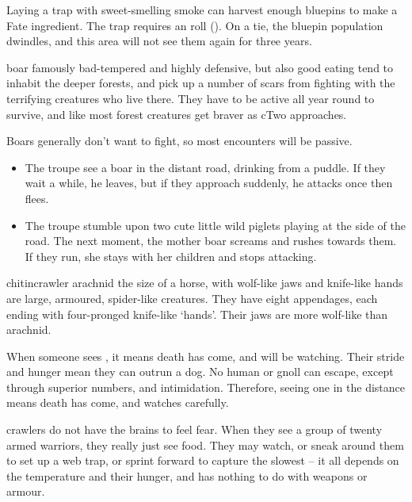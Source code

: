 \begin{multicols}{2}
Laying a trap with sweet-smelling smoke can harvest enough bluepins to make a Fate \gls{ingredient}.
The trap requires an  roll (\tn[12]).
On a tie, the bluepin population dwindles, and this area will not see them again for three years.

  {boar}%
  {famously bad-tempered and highly defensive, but also good eating}%
tend to inhabit the deeper forests, and pick up a number of scars from fighting with the terrifying creatures who live there.
They have to be active all year round to survive, and like most forest creatures get braver as \gls{cTwo} approaches.

\boar

\showEnc
Boars generally don't want to fight, so most encounters will be passive.

\begin{itemize}

  \item
  The troupe see a boar in the distant road, drinking from a puddle.
  If they wait a while, he leaves, but if they approach suddenly, he attacks once then flees.
  \item
  The troupe stumble upon two cute little wild piglets playing at the side of the road.
  The next moment, the mother boar screams and rushes towards them.
  If they run, she stays with her children and stops attacking.

\end{itemize}


  {chitincrawler}%
  {arachnid the size of a horse, with wolf-like jaws and knife-like hands}%
are large, armoured, spider-like creatures.
They have eight appendages, each ending with four-pronged knife-like `hands'.
Their jaws are more wolf-like than arachnid.

When someone sees , it means death has come, and will be watching.
Their stride and hunger mean they can outrun a dog.
No human or gnoll can escape, except through superior numbers, and intimidation.
Therefore, seeing one in the distance means death has come, and watches carefully.

\Glspl{crawler} do not have the brains to feel fear.
When they see a group of twenty armed warriors, they really just see food.
They may watch, or sneak around them to set up a web trap, or sprint forward to capture the slowest -- it all depends on the temperature and their hunger, and has nothing to do with weapons or armour.


\end{multicols}
